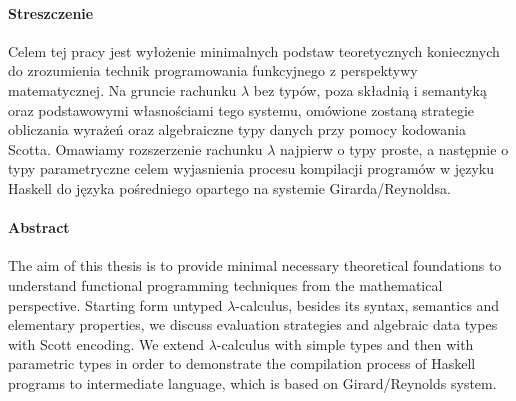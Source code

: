 \paragraph{Streszczenie}
Celem tej pracy jest wyłożenie minimalnych podstaw teoretycznych
koniecznych do zrozumienia technik programowania funkcyjnego
z perspektywy matematycznej. Na gruncie rachunku \(\lambda\) bez typów,
poza składnią i semantyką oraz podstawowymi własnościami tego systemu,
omówione zostaną strategie obliczania wyrażeń oraz algebraiczne
typy danych przy pomocy kodowania Scotta. Omawiamy rozszerzenie rachunku \(\lambda\)  najpierw o typy proste,
a następnie o typy parametryczne celem wyjasnienia procesu kompilacji
programów w języku Haskell do języka pośredniego opartego na 
systemie Girarda/Reynoldsa.

\paragraph{Abstract}
The aim of this thesis is to provide minimal necessary theoretical foundations
to understand functional programming techniques from the
mathematical perspective. Starting form untyped \(\lambda\)-calculus,
besides its syntax, semantics and elementary properties, we discuss
evaluation strategies and algebraic data types with Scott encoding. We extend \(\lambda\)-calculus
with simple types and then with parametric types in order to demonstrate
the compilation process of Haskell programs to intermediate language,
which is based on Girard/Reynolds system.
